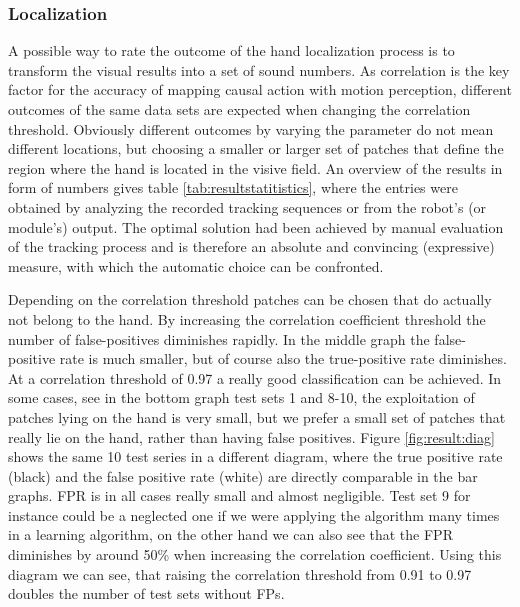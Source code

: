 \subsubsection{Localization}
\label{results:evaluation:localization}
%
A possible way to rate the outcome of the hand localization process is to transform the visual results into a set of sound numbers. As correlation is the key factor for the accuracy of mapping causal action with motion perception, different outcomes of the same data sets are expected when changing the correlation threshold. Obviously different outcomes by varying the parameter do not mean different locations, but choosing a smaller or larger set of patches that define the region where the hand is located in the visive field. An overview of the results in form of numbers gives table \ref{tab:resultstatitistics}, where the entries were obtained by analyzing the recorded tracking sequences or from the robot's (or module's) output. 
%
The optimal solution had been achieved by manual evaluation of the tracking process and is therefore an absolute and convincing (expressive) measure, with which the automatic choice can be confronted. 

Depending on the correlation threshold patches can be chosen that do actually not belong to the hand. By increasing the correlation coefficient threshold the number of false-positives diminishes rapidly. In the middle graph the false-positive rate is much smaller, but of course also the true-positive rate diminishes. At a correlation threshold of 0.97 a really good classification can be achieved. In some cases, see in the bottom graph test sets 1 and 8-10, the exploitation of patches lying on the hand is very small, but we prefer a small set of patches that really lie on the hand, rather than having false positives. Figure \ref{fig:result:diag} shows the same 10 test series in a different diagram, where the true positive rate (black) and the false positive rate (white) are directly comparable in the bar graphs. FPR is in all cases really small and almost negligible. Test set 9 for instance could be a neglected one if we were applying the algorithm many times in a learning algorithm, on the other hand we can also see that the FPR diminishes by around 50\% when increasing the correlation coefficient. Using this diagram we can see, that raising the correlation threshold from 0.91 to 0.97 doubles the number of test sets without FPs. 

